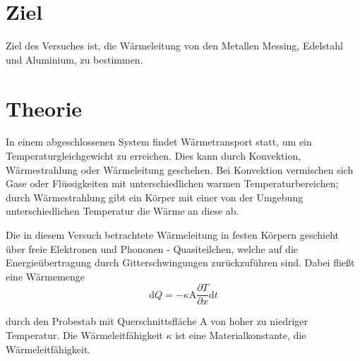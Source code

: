 \section{Ziel}
\label{sec:ziel}
Ziel des Versuches ist, die Wärmeleitung von den Metallen Messing, Edelstahl und Aluminium, zu bestimmen.

\section{Theorie}
\label{sec:theorie}

In einem abgeschlossenen System findet Wärmetransport statt, um ein Temperaturgleichgewicht zu erreichen. Dies kann durch Konvektion, Wärmestrahlung oder Wärmeleitung geschehen. Bei Konvektion vermischen sich Gase oder Flüssigkeiten mit unterschiedlichen warmen Temperaturbereichen; durch Wärmestrahlung gibt ein Körper mit einer von der Umgebung unterschiedlichen Temperatur die Wärme an diese ab.

Die in diesem Versuch betrachtete Wärmeleitung in festen Körpern geschieht über freie Elektronen und Phononen - Quasiteilchen, welche auf die Energieübertragung durch Gitterschwingungen zurückzuführen sind. 
Dabei fließt eine Wärmemenge 
\begin{equation}
	\label{waermemenge}
	\mathup{d}Q=-\kappa\mathup{A}\frac{\partial{T}}{\partial{x}}\mathup{d}t
\end{equation}

durch den Probestab mit Querschnittsfläche A von hoher zu niedriger Temperatur. Die Wärmeleitfähigkeit $\kappa$ ist eine Materialkonstante, die Wärmeleitfähigkeit.
